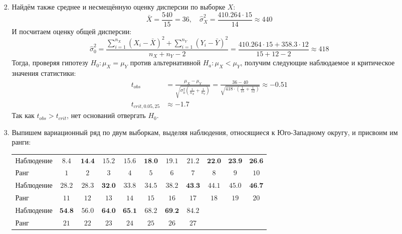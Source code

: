 \begin{enumerate}[resume]
\begin{enumerate}
\begin{enumerate}
\[\]
\item Найдём также среднее и несмещённую оценку дисперсии по выборке $X$:
\[
\bar X = \frac{540}{15} = 36, \quad \hat{\sigma}^2_X = \frac{410.264 \cdot 15}{14} \approx 440
\]
И посчитаем оценку общей дисперсии:
\[
\hat{\sigma}^2_0 = \frac{\sum_{i=1}^{n_X} \left(X_i - \bar X\right)^2 + \sum_{i=1}^{n_Y} \left(Y_i - \bar Y\right)^2}{n_X + n_Y - 2} =  \frac{410.264 \cdot 15 + 358.3 \cdot 12}{15 + 12 - 2} \approx 418
\]
Тогда, проверяя гипотезу $H_0: \mu_X = \mu_Y$ против альтернативной $H_a: \mu_X < \mu_Y$,
получим следующие наблюдаемое и критическое значения статистики:
\begin{align*}
t_{obs} &= \frac{\mu_X - \mu_Y}{\sqrt{\sigma^2_0 \left(\frac{1}{n_X} + \frac{1}{n_Y}\right)}} = \frac{36 - 40}{\sqrt{418 \cdot \left(\frac{1}{15} + \frac{1}{12}\right)}} \approx -0.51 \\
t_{crit, 0.05, 25} &\approx -1.7
\end{align*}
Так как $t_{obs} > t_{crit}$, нет оснований отвергать $H_0$.
\item Выпишем вариационный ряд по двум выборкам, выделяя наблюдения, относящиеся к
Юго-Западному округу, и присвоим им ранги:

\begin{center}
\begin{tabular}{@{}lcccccccccc@{}}
\toprule
Наблюдение & $8.4$           & $\textbf{14.4}$ & $15.2$          & $15.6$          & $\textbf{18.0}$ & $19.1$          & $21.2$          & $\textbf{22.0}$ & $\textbf{23.9}$ & $\textbf{26.6}$ \\
Ранг       & $1$             & $2$             & $3$             & $4$             & $5$             & $6$             & $7$             & $8$             & $9$             & $10$            \\ \midrule
Наблюдение & $28.2$          & $28.3$          & $\textbf{32.0}$ & $33.8$          & $34.5$          & $38.2$          & $\textbf{43.3}$ & $44.1$          & $45.0$          & $\textbf{46.7}$ \\
Ранг       & $11$            & $12$            & $13$            & $14$            & $15$            & $16$            & $17$            & $18$            & $19$            & $20$            \\ \midrule
Наблюдение & $\textbf{54.8}$ & $56.0$          & $\textbf{64.0}$ & $\textbf{65.1}$ & $68.2$          & $\textbf{69.2}$ & $84.2$ \\
Ранг       & $21$            & $22$            & $23$            & $24$            & $25$            & $26$            & $27$   \\ \bottomrule
\end{tabular}
\end{center}


\end{enumerate}
\end{enumerate}
\end{enumerate}
